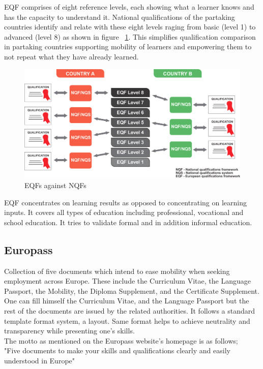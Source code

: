 \documentclass[12pt,a4paper,oneside]{book}
\begin{document}
    EQF comprises of eight reference levels, each showing what a learner knows and has the capacity to understand it. National qualifications of the partaking countries identify and relate with these eight levels raging from basic (level 1) to advanced (level 8) as shown in figure ~\ref{fig:EQF}. This simplifies qualification comparison in partaking countries supporting mobility of learners and empowering them to not repeat what they have already learned. \\

\begin{figure}[!hbp]
  \centering
  \includegraphics[width=14cm]{eqf.png}
  \caption{EQFs against NQFs \cite{MAPQFTOOL}}
  \label{fig:EQF}
\end{figure}

    EQF concentrates on learning results as opposed to concentrating on learning inputs. It covers all types of education including professional, vocational and school education. It tries to validate formal and in addition informal education. 

    \subsection{Europass}
    Collection of five documents which intend to ease mobility when seeking employment across Europe. These include the Curriculum Vitae, the Language Passport, the Mobility, the Diploma Supplement, and the Certificate Supplement. One can fill himself the Curriculum Vitae, and the Language Passport but the rest of the documents are issued by the related authorities. It follows a standard template format system, a layout. Same format helps to achieve neutrality and transparency while presenting one's skills. \\

    The motto as mentioned on the Europass website's homepage is as follows; \\
    "Five documents to make your skills and qualifications clearly and easily understood in Europe" \cite{Europass Web} \\
\end{document}
